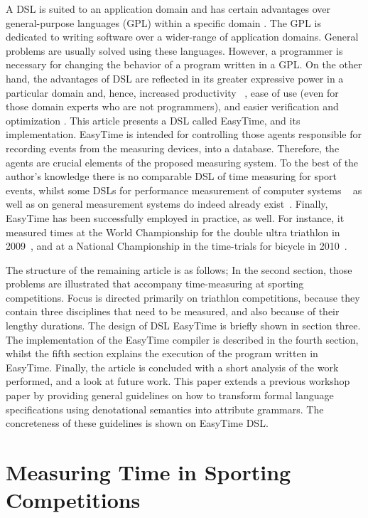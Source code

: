 \documentclass[preprint, prX]{revtex4}
\begin{document}
A DSL is suited to an application domain and has certain advantages over general-purpose languages (GPL) within a specific domain
\cite{Mernik:2005}. The GPL is dedicated to writing software over a wider-range of application domains. General problems are usually solved using these languages. However, a programmer is necessary for changing the behavior of a program written in a GPL. On the
other hand, the advantages of DSL are reflected in its greater expressive power in a particular domain and, hence, increased productivity~\cite{Kosar:ESE:2011} , ease of use (even for those domain experts who are not programmers), and easier verification and optimization \cite{Mernik:2005}. This article presents a DSL called EasyTime, and its implementation. EasyTime is intended for controlling those agents responsible for recording events from the measuring devices, into a database. Therefore, the agents are crucial elements of the proposed measuring system. To the best of the author's knowledge there is no comparable DSL of time measuring for sport events, whilst some DSLs for performance measurement of computer systems ~\cite{Arpaia:2011,Pakin:2007} as well as on general measurement systems do indeed already exist~\cite{Kos:2011}. Finally, EasyTime has been successfully employed in practice, as well. For instance, it measured times at the World Championship for the double ultra triathlon in 2009~\cite{Fister:2011}, and at a National Championship in the time-trials for bicycle in 2010~\cite{Fister:2011}.

The structure of the remaining article is as follows; In the second section, those problems are illustrated that accompany time-measuring at sporting competitions. Focus is directed primarily on triathlon competitions, because they contain three disciplines that need to be measured, and also because of their lengthy durations. The design of DSL EasyTime is briefly shown in section three. The implementation of the EasyTime compiler is described in the fourth section, whilst the fifth section explains the execution of the program written in EasyTime. Finally, the article is concluded with a short analysis of the work performed, and a look at future work.
This paper extends a previous workshop paper \cite{Fister:2011a} by providing general guidelines on how to transform formal language specifications using denotational semantics into attribute grammars. The concreteness of these guidelines is shown on EasyTime DSL.


\section{Measuring Time in Sporting Competitions}
\end{document}
